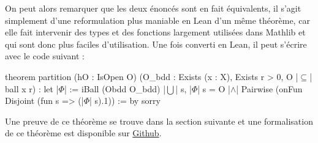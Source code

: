 \documentclass[../../rapport.tex]{subfiles}
\begin{document}
  On peut alors remarquer que les deux énoncés sont en fait équivalents, il s'agit simplement d'une reformulation
  plus maniable en Lean d'un même théorème, car elle fait intervenir des types et des fonctions largement utilisées dans Mathlib
  et qui sont donc plus faciles d'utilisation. Une fois converti en Lean, il peut s'écrire avec le code suivant :

  \begin{lean4code}
    theorem partition (hO : IsOpen O)
      (O_bdd : Exists (x : X), Exists r > 0, O |$\subseteq$| ball x r) :
      let |$\Phi$| := iBall (Obdd O_bdd)
      |$\bigcup$| s, |$\Phi$| s = O |$\wedge$| Pairwise (onFun Disjoint (fun s => (|$\Phi$| s).1)) := by sorry
  \end{lean4code}

  Une preuve de ce théorème se trouve dans la section suivante et une formalisation de ce théorème est disponible sur
  \href{https://github.com/daurrian/bowen/blob/main/Bowen/Ultrametric.lean}{Github}.
\end{document}
